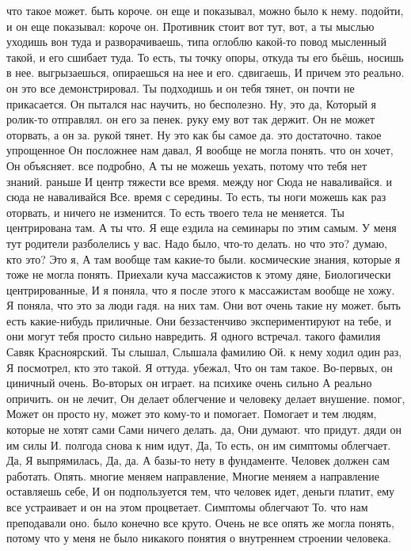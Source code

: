что такое может.
быть короче. он еще и показывал, можно было к нему.
подойти, и он еще показывал: короче он.
Противник стоит вот тут, вот, а ты мыслью уходишь вон туда и разворачиваешь, типа оглоблю какой-то повод мысленный такой, и его сшибает туда. То есть, ты точку опоры, откуда ты его бьёшь, носишь в нее.
выгрызаешься, опираешься на нее и его.
сдвигаешь, И причем это реально. он это все демонстрировал. Ты подходишь и он тебя тянет, он почти не прикасается.
Он пытался нас научить, но бесполезно. Ну, это да, Который я ролик-то отправлял. он его за пенек. руку ему вот так держит. Он не может оторвать, а он за.
рукой тянет. Ну это как бы самое да. это достаточно. такое упрощенное Он посложнее нам давал, Я вообще не могла понять.
что он хочет, Он объясняет.
все подробно, А ты не можешь уехать, потому что
тебя нет знаний.
раньше И центр тяжести все время.
между ног Сюда не наваливайся.
и сюда не наваливайся Все.
время с середины.
То есть, ты ноги можешь как раз оторвать, и ничего не изменится.
То есть твоего тела не меняется.
Ты центрирована там.
А ты что.
Я еще ездила на семинары по этим самым.
У меня тут родители разболелись у вас.
Надо было, что-то делать.
но что это?
думаю, кто это? Это я, А там вообще там какие-то были.
космические знания, которые я тоже не могла понять. Приехали куча массажистов к этому дяне, Биологически центрированные, И я поняла, что я после этого к массажистам вообще не хожу. Я поняла, что это за люди гадя.
на них там. Они вот очень такие ну может.
быть есть какие-нибудь приличные. Они беззастенчиво экспериментируют на тебе, и они могут тебя просто сильно навредить. Я одного встречал.
такого фамилия Савяк Красноярский. Ты слышал, Слышала фамилию Ой.
к нему ходил один раз, Я посмотрел, кто это такой. Я оттуда.
убежал, Что он там такое.
Во-первых, он циничный очень.
Во-вторых он играет.
на психике очень сильно А реально опричить. он не лечит, Он делает облегчение и
человеку делает внушение.
помог, Может он просто ну, может это кому-то и помогает. Помогает и тем людям, которые не хотят сами Сами ничего делать.
да, Они думают.
что придут. дяди он им силы И.
полгода снова к ним идут, Да, То есть, он им симптомы облегчает. Да, Я выпрямилась, Да, да.
А базы-то нету в фундаменте. Человек должен сам работать.
Опять. многие меняем направление, Многие меняем а направление оставляешь себе, И он подпользуется тем, что человек идет, деньги платит, ему все устраивает и он на этом процветает. Симптомы облегчают То.
что нам преподавали оно.
было конечно все круто.
Очень не все опять же могла понять, потому что у меня не было никакого понятия о внутреннем строении человека.
